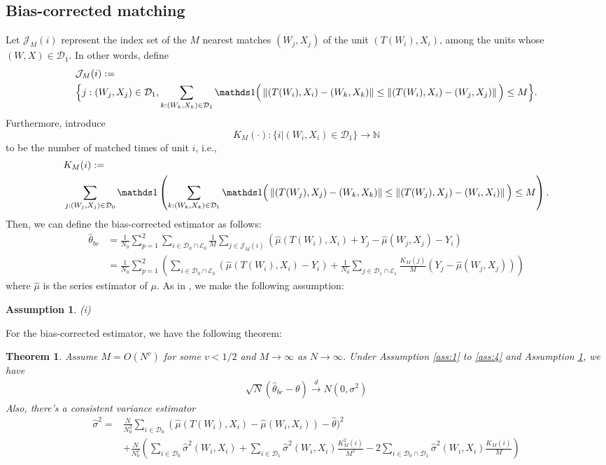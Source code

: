 \documentclass[11pt]{article}
\numberwithin{equation}{section}
\newtheorem{theorem}{Theorem}[section]
\newtheorem{assumption}{Assumption}[section]
\theoremstyle{definition}
\begin{document}
\subsection{Bias-corrected matching}
Let $\mathcal{J}_{M}(i)$ represent the index set of the $M$ nearest matches $(W_j,X_j)$ of the unit $(T(W_i),X_i)$, among the units whose $(W,X)\in\mathcal{D}_1$. In other words, define 
\begin{align*}
&\mathcal{J}_{M}(i):=\notag\\
& \Big\{j: (W_j,X_j)\in\mathcal{D}_1,\sum_{k: (W_k,X_k)\in\mathcal{D}_1} \ind\Big(\left\|(T(W_i),X_i)-(W_k,X_k)\right\| \leq\left\|(T(W_i),X_i)-(W_j,X_j)\right\|\Big) \leq M\Big\}.
\end{align*}
Furthermore, introduce 
\[
K_{M}(\cdot):\Big\{i|(W_i,X_i)\in\mathcal{D}_1\Big\}\rightarrow \mathbb{N}
\]
to be the number of matched times of unit $i$, i.e.,
\begin{align*}
&K_{M}(i):=\notag\\
&\sum_{j:(W_j,X_j)\in \mathcal{D}_0} \ind\left(\sum_{k:(W_k,X_k)\in \mathcal{D}_1}\ind\Big(\left\|(T(W_j),X_j)-(W_k,X_k)\right\| \leq\left\|(T(W_j),X_j)-(W_i,X_i)\right\|\Big)\leq M\right).
\end{align*}
Then, we can define the bias-corrected estimator as follows:
\begin{align*}
    \widehat{\theta}_{bc}&=\frac{1}{N_0}\sum_{p=1}^2\sum_{i \in \mathcal{D}_0\cap\mathcal{E}_0}\frac{1}{M}\sum_{j\in \mathcal{J}_M(i)}(\widehat{\mu}(T(W_i),X_i)+Y_{j}-\widehat{\mu}(W_{j},X_{j})-Y_i)\\
    &=\frac{1}{N_0}\sum_{p=1}^2\left(\sum_{i \in \mathcal{D}_0\cap\mathcal{E}_0}(\widehat{\mu}(T(W_i),X_i)-Y_i)+\frac{1}{N_0}\sum_{j \in \mathcal{D}_1\cap\mathcal{E}_1}\frac{K_M(j)}{M}(Y_{j}-\widehat{\mu}(W_{j},X_{j}))\right)
\end{align*}
where $\widehat{\mu}$ is the series estimator of $\mu$. As in \cite{abadie2011bias}, we make the following assumption:
\begin{assumption}\label{ass:5}
    (i) 
\end{assumption}
For the bias-corrected estimator, we have the following theorem:
\begin{theorem}\label{thm:1} 
Assume $M=O(N^v)$ for some $v<1/2$ and $M\to\infty$ as $N\to\infty$. Under Assumption \ref{ass:1} to \ref{ass:4} and Assumption \ref{ass:5}, we have
\begin{align}
    \sqrt{N}(\widehat{\theta}_{bc}-\theta)\overset{d}{\to} N(0,\sigma^2)   
\end{align}
Also, there's a consistent variance estimator
\begin{align}
    \widehat{\sigma}^2=&\frac{N}{N_0^2}\sum_{i\in \mathcal{D}_0}(\widehat{\mu}(T(W_i),X_i)-\widehat{\mu}(W_i,X_i))-\widehat{\theta})^2\\&+\frac{N}{N_0^2}\left(\sum_{i\in\mathcal{D}_0}\widehat{\sigma}^2(W_i,X_i)+\sum_{i\in\mathcal{D}_1}\widehat{\sigma}^2(W_i,X_i)\frac{K_M^2(i)}{M^2}-2\sum_{i\in\mathcal{D}_0\cap\mathcal{D}_1}\widehat{\sigma}^2(W_i,X_i)\frac{K_M(i)}{M}\right)
\end{align}
\end{theorem}
\end{document}
